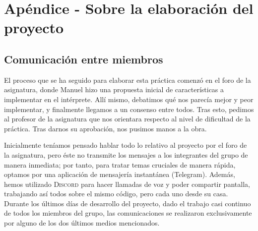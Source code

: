 \documentclass[12pt]{article}
\begin{document}
\section{Apéndice - Sobre la elaboración del proyecto}
\subsection{Comunicación entre miembros}
El proceso que se ha seguido para elaborar esta práctica comenzó en el foro de la asignatura, donde Manuel hizo una propuesta inicial de características a implementar en el intérprete. Allí mismo, debatimos qué nos parecía mejor y peor implementar, y finalmente llegamos a un consenso entre todos. Tras esto, pedimos al profesor de la asignatura que nos orientara respecto al nivel de dificultad de la práctica. Tras darnos su aprobación, nos pusimos manos a la obra.\par
Inicialmente teníamos pensado hablar todo lo relativo al proyecto por el foro de la asignatura, pero éste no transmite los mensajes a los integrantes del grupo de manera inmediata; por tanto, para tratar temas cruciales de manera rápida, optamos por una aplicación de mensajería instantánea (Telegram).  Además, hemos utilizado \textsc{Discord} para hacer llamadas de voz y poder compartir pantalla, trabajando así todos sobre el mismo código, pero cada uno desde su casa. Durante los últimos días de desarrollo del proyecto, dado el trabajo casi continuo de todos los miembros del grupo, las comunicaciones se realizaron exclusivamente por alguno de los dos últimos medios mencionados.\par
\end{document}
